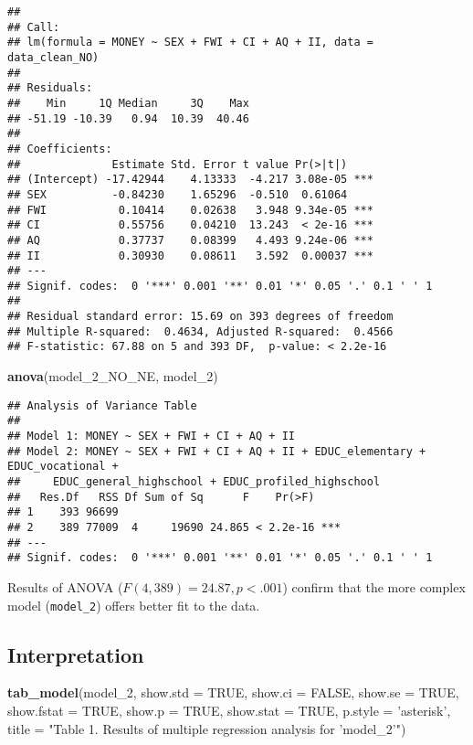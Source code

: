 \documentclass[]{article}
\newenvironment{Shaded}{\begin{snugshade}}{\end{snugshade}}
\newcommand{\DataTypeTok}[1]{\textcolor[rgb]{0.13,0.29,0.53}{#1}}
\newcommand{\DecValTok}[1]{\textcolor[rgb]{0.00,0.00,0.81}{#1}}
\newcommand{\KeywordTok}[1]{\textcolor[rgb]{0.13,0.29,0.53}{\textbf{#1}}}
\newcommand{\NormalTok}[1]{#1}
\newcommand{\OtherTok}[1]{\textcolor[rgb]{0.56,0.35,0.01}{#1}}
\newcommand{\StringTok}[1]{\textcolor[rgb]{0.31,0.60,0.02}{#1}}
\begin{document}
\begin{verbatim}
## 
## Call:
## lm(formula = MONEY ~ SEX + FWI + CI + AQ + II, data = data_clean_NO)
## 
## Residuals:
##    Min     1Q Median     3Q    Max 
## -51.19 -10.39   0.94  10.39  40.46 
## 
## Coefficients:
##              Estimate Std. Error t value Pr(>|t|)    
## (Intercept) -17.42944    4.13333  -4.217 3.08e-05 ***
## SEX          -0.84230    1.65296  -0.510  0.61064    
## FWI           0.10414    0.02638   3.948 9.34e-05 ***
## CI            0.55756    0.04210  13.243  < 2e-16 ***
## AQ            0.37737    0.08399   4.493 9.24e-06 ***
## II            0.30930    0.08611   3.592  0.00037 ***
## ---
## Signif. codes:  0 '***' 0.001 '**' 0.01 '*' 0.05 '.' 0.1 ' ' 1
## 
## Residual standard error: 15.69 on 393 degrees of freedom
## Multiple R-squared:  0.4634, Adjusted R-squared:  0.4566 
## F-statistic: 67.88 on 5 and 393 DF,  p-value: < 2.2e-16
\end{verbatim}

\begin{Shaded}
\begin{Highlighting}[]
\KeywordTok{anova}\NormalTok{(model_}\DecValTok{2}\NormalTok{_NO_NE, model_}\DecValTok{2}\NormalTok{)}
\end{Highlighting}
\end{Shaded}

\begin{verbatim}
## Analysis of Variance Table
## 
## Model 1: MONEY ~ SEX + FWI + CI + AQ + II
## Model 2: MONEY ~ SEX + FWI + CI + AQ + II + EDUC_elementary + EDUC_vocational + 
##     EDUC_general_highschool + EDUC_profiled_highschool
##   Res.Df   RSS Df Sum of Sq      F    Pr(>F)    
## 1    393 96699                                  
## 2    389 77009  4     19690 24.865 < 2.2e-16 ***
## ---
## Signif. codes:  0 '***' 0.001 '**' 0.01 '*' 0.05 '.' 0.1 ' ' 1
\end{verbatim}

Results of ANOVA (\(F(4, 389) = 24.87, p < .001\)) confirm that the more
complex model (\texttt{model\_2}) offers better fit to the data.

\hypertarget{interpretation}{%
\subsection{Interpretation}\label{interpretation}}

\begin{Shaded}
\begin{Highlighting}[]
\KeywordTok{tab_model}\NormalTok{(model_}\DecValTok{2}\NormalTok{,}
          \DataTypeTok{show.std =} \OtherTok{TRUE}\NormalTok{,}
          \DataTypeTok{show.ci  =} \OtherTok{FALSE}\NormalTok{,}
          \DataTypeTok{show.se  =} \OtherTok{TRUE}\NormalTok{, }
          \DataTypeTok{show.fstat =} \OtherTok{TRUE}\NormalTok{,}
          \DataTypeTok{show.p =} \OtherTok{TRUE}\NormalTok{,}
          \DataTypeTok{show.stat =} \OtherTok{TRUE}\NormalTok{,}
          \DataTypeTok{p.style =} \StringTok{'asterisk'}\NormalTok{,}
          \DataTypeTok{title =} \StringTok{"Table 1. Results of multiple regression analysis for 'model_2'"}\NormalTok{)}
\end{Highlighting}
\end{Shaded}
\end{document}
